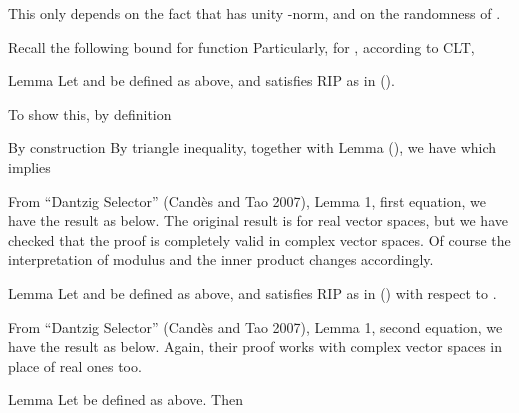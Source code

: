 This only depends on the fact that  has unity -norm, and on the randomness of .

Recall the following bound for  function
Particularly, for , according to CLT,

\color[red]{(To be done)}

\Result
{Lemma}
{
Let  and  be defined as above, and  satisfies RIP as in ().
%
}

To show this, by definition
%

By construction
By triangle inequality, together with Lemma (), we have
which implies

From ``Dantzig Selector'' (Cand\`es and Tao 2007), Lemma 1, first equation, we have the result as below.
The original result is for real vector spaces, but we have checked that the proof is completely valid in complex vector spaces.
Of course the interpretation of modulus and the inner product changes accordingly.


\Result
{Lemma}
{
Let  and  be defined as above, and  satisfies RIP as in () with respect to .
%
%
}

From ``Dantzig Selector'' (Cand\`es and Tao 2007), Lemma 1, second equation, we have the result as below.
Again, their proof works with complex vector spaces in place of real ones too.

\Result
{Lemma}
{
Let  be defined as above.
Then
%
%
}

